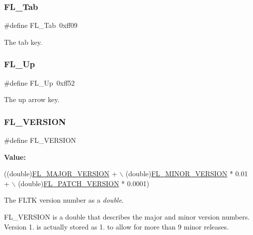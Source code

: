 \subsubsection{\texorpdfstring{F\+L\+\_\+\+Tab}{FL\_Tab}}
{\footnotesize\ttfamily \#define F\+L\+\_\+\+Tab~0xff09}



The tab key. 

\mbox{\label{_enumerations_8_h_a050700391ba0940ca16b0e5dbf4644f0}} 
\subsubsection{\texorpdfstring{F\+L\+\_\+\+Up}{FL\_Up}}
{\footnotesize\ttfamily \#define F\+L\+\_\+\+Up~0xff52}



The up arrow key. 

\mbox{\label{_enumerations_8_h_a94499c96b5f3ca212d90a2c41f947a67}} 
\subsubsection{\texorpdfstring{F\+L\+\_\+\+V\+E\+R\+S\+I\+ON}{FL\_VERSION}}
{\footnotesize\ttfamily \#define F\+L\+\_\+\+V\+E\+R\+S\+I\+ON}

{\bfseries Value\+:}
\begin{DoxyCode}
((double)\hyperlink{_enumerations_8_h_a10c923db4d613150c8a3937f9775ccd0}{FL\_MAJOR\_VERSION} + \(\backslash\)
                 (\textcolor{keywordtype}{double})\hyperlink{_enumerations_8_h_a165d2781eff3186354a5f5db0528976d}{FL\_MINOR\_VERSION} * 0.01 + \(\backslash\)
                 (double)\hyperlink{_enumerations_8_h_afc7b82e6fcfbb451d38e8a0cacde302a}{FL\_PATCH\_VERSION} * 0.0001)
\end{DoxyCode}
The F\+L\+TK version number as a {\itshape double}.

F\+L\+\_\+\+V\+E\+R\+S\+I\+ON is a double that describes the major and minor version numbers. Version 1. is actually stored as 1. to allow for more than 9 minor releases.

